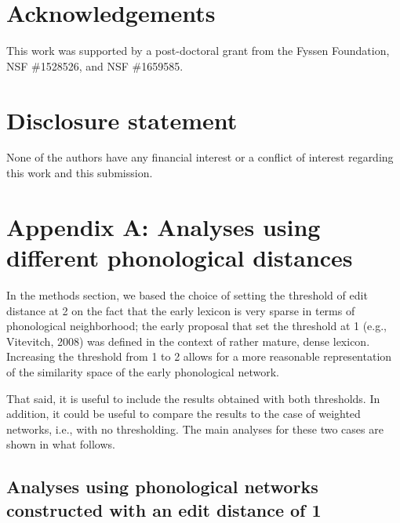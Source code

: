 \documentclass[english,,man,floatsintext]{apa6}
\begin{document}
\vspace{1em}

 \vspace{1em}

\hypertarget{acknowledgements}{%
\section{Acknowledgements}\label{acknowledgements}}

This work was supported by a post-doctoral grant from the Fyssen Foundation, NSF \#1528526, and NSF \#1659585.

\hypertarget{disclosure-statement}{%
\section{Disclosure statement}\label{disclosure-statement}}

None of the authors have any financial interest or a conflict of interest regarding this work and this submission.

\clearpage

\hypertarget{appendix-a-analyses-using-different-phonological-distances}{%
\section{Appendix A: Analyses using different phonological distances}\label{appendix-a-analyses-using-different-phonological-distances}}

In the methods section, we based the choice of setting the threshold of edit distance at 2 on the fact that the early lexicon is very sparse in terms of phonological neighborhood; the early proposal that set the threshold at 1 (e.g., Vitevitch, 2008) was defined in the context of rather mature, dense lexicon. Increasing the threshold from 1 to 2 allows for a more reasonable representation of the similarity space of the early phonological network.

That said, it is useful to include the results obtained with both thresholds. In addition, it could be useful to compare the results to the case of weighted networks, i.e., with no thresholding. The main analyses for these two cases are shown in what follows.

\hypertarget{analyses-using-phonological-networks-constructed-with-an-edit-distance-of-1}{%
\subsection{Analyses using phonological networks constructed with an edit distance of 1}\label{analyses-using-phonological-networks-constructed-with-an-edit-distance-of-1}}
\end{document}
